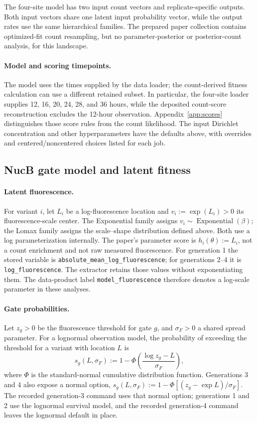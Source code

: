 The four-site model has two input count vectors and replicate-specific
outputs. Both input vectors share one latent input probability vector, while
the output rates use the same hierarchical families. The prepared paper
collection contains optimized-fit count resampling, but no parameter-posterior
or posterior-count analysis, for this landscape.

\paragraph{Model and scoring timepoints.}
The model uses the times supplied by the data loader; the count-derived
fitness calculation can use a different retained subset. In particular,
the four-site loader supplies 12, 16, 20, 24, 28, and 36 hours, while the
deposited count-score reconstruction excludes the 12-hour observation.
Appendix~\ref{app:scores} distinguishes those score rules from the count
likelihood. The input Dirichlet concentration and other hyperparameters have
the defaults above, with overrides and centered/noncentered choices listed
for each job.

\subsection{NucB gate model and latent fitness}
\label{app:nuc-model}

\paragraph{Latent fluorescence.}
For variant $i$, let $L_i$ be a log-fluorescence location and
$v_i:=\exp(L_i)>0$ its fluorescence-scale center. The Exponential family
assigns $v_i\sim\operatorname{Exponential}(\beta)$; the Lomax family
assigns the scale--shape distribution defined above. Both use a log
parameterization internally. The paper's parameter score is
$h_i(\theta):=L_i$, not a count enrichment and not raw measured fluorescence.
For generation 1 the stored variable is
\texttt{absolute\_mean\_log\_fluorescence}; for generations 2--4 it is
\texttt{log\_fluorescence}. The extractor retains those values without
exponentiating them. The data-product label \texttt{model\_fluorescence}
therefore denotes a log-scale parameter in these analyses.

\paragraph{Gate probabilities.}
Let $z_g>0$ be the fluorescence threshold for gate $g$, and
$\sigma_F>0$ a shared spread parameter. For a lognormal observation model,
the probability of exceeding the threshold for a variant with location $L$
is
\[
s_g(L,\sigma_F):=1-\Phi\!\left(\frac{\log z_g-L}{\sigma_F}\right),
\]
where $\Phi$ is the standard-normal cumulative distribution function.
Generations 3 and 4 also expose a normal option,
$s_g(L,\sigma_F):=1-\Phi[(z_g-\exp L)/\sigma_F]$.
The recorded generation-3 command uses that normal option; generations 1
and 2 use the lognormal survival model, and the recorded generation-4
command leaves the lognormal default in place.

